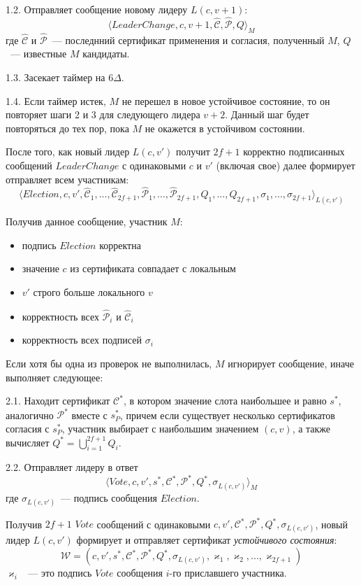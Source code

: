 1.2. Отправляет сообщение новому лидеру $L(c, v+1)$:
\[ \langle LeaderChange, c, v+1,  \hat{\mathcal{C}}, \hat{\mathcal{P}}, Q \rangle_M \]
где $\hat{\mathcal{C}}$ и $\hat{\mathcal{P}}$~--- последнний сертификат применения и согласия, полученный $M$, $Q$~--- известные $M$ кандидаты.

1.3. Засекает таймер на $6\Delta$.

1.4. Если таймер истек, $M$ не перешел в новое устойчивое состояние, то он повторяет шаги 2 и 3 для следующего лидера $v+2$. Данный шаг будет повторяться до тех пор, пока $M$ не окажется в устойчивом состоянии.
\vspace{10pt}

После того, как новый лидер $L(c, v')$ получит $2f+1$ корректно подписанных сообщений $LeaderChange$ с одинаковыми $c$ и $v'$  (включая свое) далее формирует отправляет всем участникам:
\[ \langle Election, c, v', \hat{\mathcal{C}}_1,...,\hat{\mathcal{C}}_{2f+1}, \hat{\mathcal{P}}_1,...,\hat{\mathcal{P}}_{2f+1}, Q_1,..., Q_{2f+1}, \sigma_1,..., \sigma_{2f+1}\rangle_{L(c, v')} \]

Получив данное сообщение, участник $M$:
\begin{itemize}
\item подпись $Election$ корректна
\item значение $c$ из сертификата совпадает с локальным
\item $v'$ строго больше локального $v$
\item корректность всех $\hat{\mathcal{P}}_i$ и $\hat{\mathcal{C}}_i$
\item корректность всех подписей $\sigma_i$
\end{itemize}
Если хотя бы одна из проверок не выполнилась, $M$ игнорирует сообщение, иначе выполняет следующее:

2.1. Находит сертификат $\mathcal{C}^{*}$, в котором значение слота наибольшее и равно $s^{*}$, аналогично $\mathcal{P}^{*}$ вместе с  $s_P^{*}$, причем если существует несколько сертификатов согласия с $s_P^{*}$, участник выбирает с наибольшим значением $(c, v)$, а также вычисляет $Q^{*} = \bigcup\limits_{i=1}^{2f+1} Q_i$.

2.2. Отправляет лидеру в ответ
\[ \langle Vote, c, v', s^{*}, \mathcal{C}^{*}, \mathcal{P}^{*}, Q^{*}, \sigma_{L(c, v')} \rangle_M \]
где $\sigma_{L(c, v')}$~--- подпись сообщения $Election$.
\vspace{10pt}

Получив $2f+1$ $Vote$ сообщений с одинаковыми $c, v', \mathcal{C}^{*}, \mathcal{P}^{*}, Q^{*}, \sigma_{L(c, v')}$, новый лидер $L(c, v')$ формирует и отправляет сертификат \textit{устойчивого состояния}:
$$\mathcal{W}=(c, v', s^{*}, \mathcal{C}^{*}, \mathcal{P}^{*}, Q^{*}, \sigma_{L(c, v')}, \varkappa_1, \varkappa_2,..., \varkappa_{2f+1})$$
$\varkappa_i$ ~--- это подпись $Vote$ сообщения $i$-го приславшего участника.

